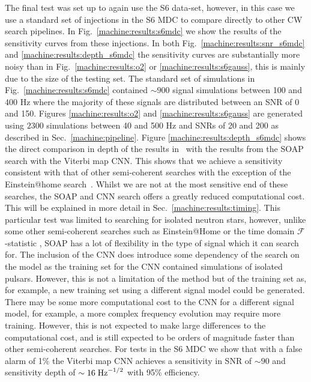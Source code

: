 %
The final test was set up to again use the S6 data-set, however, in this case
we use a standard set of injections in the S6
\gls{MDC} \citep{walsh2016ComparisonMethods} to compare directly to other \gls{CW}
search pipelines. In Fig.~\ref{machine:results:s6mdc} we show the results of the
sensitivity curves from these injections. 
In both Fig.~\ref{machine:results:snr_s6mdc} and \ref{machine:results:depth_s6mdc} the sensitivity curves are substantially more noisy than in Fig.~\ref{machine:results:o2} or \ref{machine:results:s6gauss}, this is mainly due to the size of the testing set.
The standard set of simulations in Fig.~\ref{machine:results:s6mdc} contained $\sim 900$ signal simulations between 100 and 400 Hz where the majority of these signals are distributed between an \gls{SNR} of 0 and 150. 
Figures \ref{machine:results:o2} and \ref{machine:results:s6gauss} are generated using $2300$ simulations between 40 and 500 Hz and \glspl{SNR} of 20 and 200 as described in Sec.~\ref{machine:pipeline}.
Figure \ref{machine:results:depth_s6mdc} shows the direct comparison in depth of the
results in~\citep{walsh2016ComparisonMethods} with the results from the SOAP
search with the Viterbi map \gls{CNN}. This shows that we achieve a sensitivity
consistent with that of other semi-coherent searches with the
exception of the Einstein@home search~\citep{abbott2016ResultsDeepest}. Whilst
we are not at the most sensitive end of these searches, the SOAP and \gls{CNN}
search offers a greatly reduced computational cost. This will be explained in more detail in
Sec.~\ref{machine:results:timing}. This particular test was limited to searching for
isolated neutron stars, however, unlike some other semi-coherent searches such as Einstein@Home \citep{singh2016ResultsAllsky} or the time domain $\mathcal{F}$-statistic \citep{aasi2014ImplementationTextdollar}, SOAP has a lot of flexibility in the type of signal which it can search for.
The inclusion of the \gls{CNN} does introduce some dependency of the search
on the model as the training set for the \gls{CNN} contained simulations of isolated pulsars. 
However, this is not a limitation of the method but of the training set as, for example, a new training set using a different signal model could be generated. 
There may be some more computational cost to the \gls{CNN} for a different signal model, for example, a more complex frequency evolution may require more training. However, this is not expected to make large differences to the computational cost, and is still expected to be orders of magnitude faster than other semi-coherent searches. 
For tests in the S6 \gls{MDC} we show that with a false alarm of 1\% the Viterbi map
\gls{CNN} achieves a sensitivity in SNR of $\sim 90$ and sensitivity depth of
$\sim 16\;{\rm Hz}^{-1/2}$ with 95\% efficiency.


